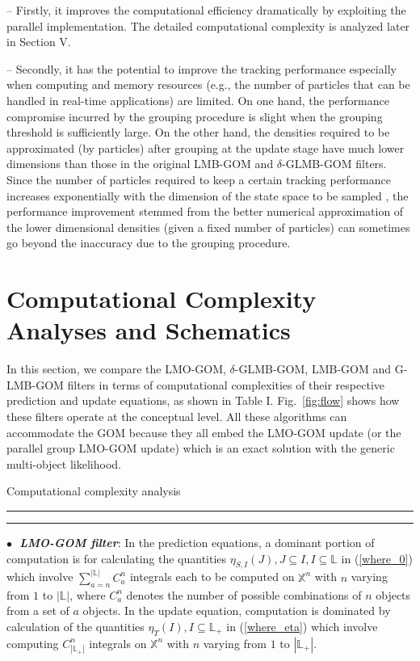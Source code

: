 \documentclass[journal]{IEEEtran}
\begin{document}
{\noindent-- Firstly, it  improves the computational efficiency dramatically by exploiting the  parallel  implementation. The detailed computational complexity is analyzed later in Section V. 

\noindent-- Secondly, it has the potential to improve the tracking performance especially when computing and memory resources (e.g., the  number of particles that can be handled in real-time applications) are limited. On one hand, the performance compromise incurred by the grouping procedure  is slight  when the grouping threshold is sufficiently large. On the other hand,   the densities required to be approximated (by particles) after grouping at the update stage have much lower dimensions than those in the original LMB-GOM and $\delta$-GLMB-GOM filters.  Since the number of particles required to keep a certain tracking performance increases exponentially with the dimension of the state space to be sampled \cite{refr:curse_dimension,refr:tbd-3}, the performance improvement stemmed from the better numerical approximation of the lower dimensional densities (given a fixed number of particles)  can sometimes go   beyond the inaccuracy due to the grouping procedure.






\section{Computational Complexity Analyses and Schematics}\label{chp:6}
In this section, we compare the LMO-GOM, $\delta$-GLMB-GOM, LMB-GOM and G-LMB-GOM filters
 in terms of 
computational complexities of their respective prediction and update equations, as shown in Table I. Fig.~\ref{fig:flow} shows how these filters operate at the conceptual level.  
All these algorithms can accommodate the GOM because they all embed the  LMO-GOM update (or the parallel group LMO-GOM update)  which is  an exact solution with the generic multi-object likelihood. 



\begin{table}[h]
\caption{Computational complexity analysis}
\hrule\vspace{0.7mm}\hrule
\vspace{2mm}
$\bullet\,\,$
\textit{\textbf{LMO-GOM filter}}:  In the prediction equations, a dominant portion of computation is for calculating the quantities $\eta_{S,I}(J) , J\subseteq I, I\subseteq\mathbb{L}$ in (\ref{where_0}) which involve $ \sum_{a=n}^{|\mathbb{L}|}C_a^n$ integrals each to be computed on $\mathbb{X}^n$ with $n$ varying from $1$ to $|\mathbb{L}|$, where  $C_a^n$ denotes the number of possible combinations of $n$ objects from a set of $a$ objects. In the update equation, computation is dominated by calculation of the quantities $\eta_{\Upsilon}(I), I\subseteq\mathbb{L_+}$ in (\ref{where_eta}) which involve computing $C_{|\mathbb{L}_+|}^n$ integrals on $\mathbb{X}^n$ with $n$ varying from $1$ to $|\mathbb{L}_+|$. 
\vspace{2mm}


\end{table}}
\end{document}
